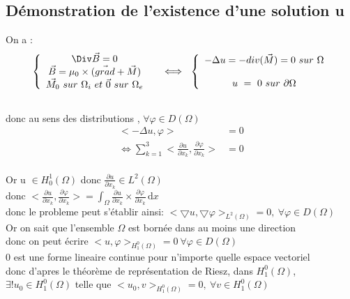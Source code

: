 \documentclass[a4paper,12pt,titlepage]{report}
\begin{document}
\begin{onehalfspace}
\begin{appendix}
\chapter{Démonstration de l'existence d'une solution u}
\label{Démonstration 1}
On a : 
\[
\left \{
\begin{array}{ccc}
  \Div\vec{B} = 0   &   \\
  \vec{B} = \mu_{0}\times(\vec{grad} +\vec{M}) \\
  \vec{M_{0} } \ sur \  \Omega_{i}  \ et \ \vec{0}  \ sur \  \Omega_{e}
\end{array}
\right .
 \iff \ \left\{\begin{array}{cc} -\Delta u= -div(\vec{M})=0 \ sur\ \Omega \\ \\u \ = \ 0 \ sur \ \partial \Omega \end{array}\right.
\]
\\
donc au sens des distributions , $\forall \varphi \in D(\Omega)$ 
\[
\begin{aligned}
<-\Delta u,\varphi> &=  0 \\
\iff \sum_{k=1}^{3} <  \frac{\partial u}{\partial x_{k}}, \frac{\partial \varphi}{\partial x_{k}}> &= 0
\end{aligned}
\]
\\
Or u $\in H^{1}_{0}(\Omega)$ donc $ \frac{\partial u}{\partial x_k} \in L^{2}(\Omega)$
\\
donc $<  \frac{\partial u}{\partial x_k}, \frac{\partial \varphi}{\partial x_k}>=\int_{\Omega} \frac{\partial u}{\partial x_k} \times \frac{\partial \varphi}{\partial x_k}\, \mathrm{d}x $
\\
donc le probleme peut s'établir ainsi: $<\bigtriangledown u ,\bigtriangledown \varphi>_{L^{2}(\Omega) }= 0 ,\ \forall \varphi \in D(\Omega) $
\\
Or on sait que l'ensemble $\Omega$ est bornée dans au moins une direction 
\\
donc on peut écrire $< u,\varphi>_{H^{0}_{1}(\Omega)}=0 \ \forall \varphi \in D(\Omega) $
\\
 0 est une forme lineaire continue pour n'importe quelle espace vectoriel 
 \\ donc d'apres le théorème de représentation de Riesz, dans $H^{0}_{1}(\Omega)$,
\\
$\exists ! u_{0} \in H^{0}_{1}(\Omega)$ telle que $<u_{0},v>_{H^{0}_{1}(\Omega)}=0,\ \forall v\in {H^{0}_{1}(\Omega)} $


\end{appendix}
\end{onehalfspace}
\end{document}
